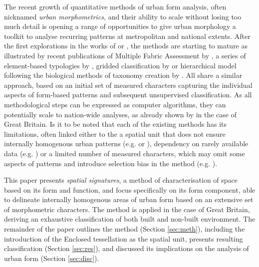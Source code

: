 The recent growth of quantitative methods of urban form analysis, often nicknamed
\textit{urban morphometrics}, and their ability to scale without losing too much detail
is opening a range of opportunities to give urban morphology a toolkit to analyse
recurring patterns at metropolitan and national extents. After the first explorations in
the works of \cite{gil2012} or \cite{hamaina2012a}, the methods are starting to mature
as illustrated by recent publications of Multiple Fabric Assessment by
\cite{araldi2019}, a series of element-based typologies by \cite{berghauserpont2019a},
gridded classification by \cite{jochem2020} or hierarchical model following the
biological methods of taxonomy creation by \cite{fleischmann2021a}. All share a similar
approach, based on an initial set of measured characters capturing the individual
aspects of form-based patterns and subsequent unsupervised classification. As all
methodological steps can be expressed as computer algorithms, they can potentially scale
to nation-wide analyses, as already shown by \cite{jochem2020} in the case of Great
Britain.
Is it to be noted that each of the existing methods has its
limitations, often linked either to the a spatial unit that does not ensure internally
homogenous urban patterns (e.g. \cite{jochem2020} or \cite{araldi2019}), dependency on rarely
available data (e.g. \cite{berghauserpont2019a}) or a limited number of measured characters,
which may omit some aspects of patterns and introduce selection bias in the method
(e.g. \cite{berghauserpont2019a}).

This paper presents \textit{spatial signatures}, a method of characterisation of space
based on its form and function, and focus specifically on its form component, able to
delineate internally homogenous areas of urban form based on an extensive set of
morphometric characters. The method is applied in the case of Great Britain, deriving an
exhaustive classification of both built and non-built environment. The remainder of the
paper outlines the method (Section \ref{sec:meth}), including the introduction of the
Enclosed tessellation as the spatial unit, presents resulting classification (Section
\ref{sec:res}), and discussed its implications on the analysis of urban form (Section
\ref{sec:disc}).